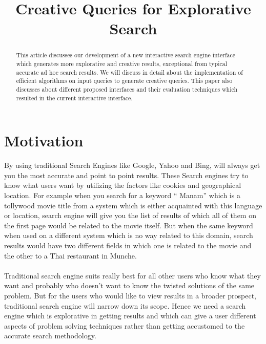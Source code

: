 \documentclass[conference]{IEEEtran}
\begin{document}
\title{Creative Queries for Explorative Search}



\author{
\and
{}
}


\maketitle


\begin{abstract}
This article discusses our development of a new interactive search engine interface which generates more explorative and creative results, exceptional from typical accurate ad hoc search results. We will discuss in detail about the implementation of efficient algorithms on input queries to generate creative queries. This paper also discusses about different proposed interfaces and their evaluation techniques which resulted in the current interactive interface.
\end{abstract}


\IEEEpeerreviewmaketitle

\section{Motivation}

By using traditional Search Engines like Google, Yahoo and  Bing, will always get you the most accurate and point to point results. These Search engines try to know what users want by utilizing the factors like cookies and geographical location. For example when you search for a keyword “ Manam” which is a tollywood movie title from a system which is either acquainted with this language or location, search engine will give you the list of results of which all of them on the first page would be related to the movie itself. But when the same keyword when used on a different system which is no way related to this domain, search results would have two different fields in which one is related to the movie and the other to a Thai restaurant in Munche.\\ \\
Traditional search engine suits really best for all other users who know what they want and probably who doesn't want to know the twisted solutions of the same problem. But for the users who would like to view results in a broader prospect, traditional search engine will  narrow down its scope. Hence we need a search engine which is explorative in getting results and which can give a user different aspects of problem solving techniques rather than getting accustomed to the accurate search methodology.
\end{document}
